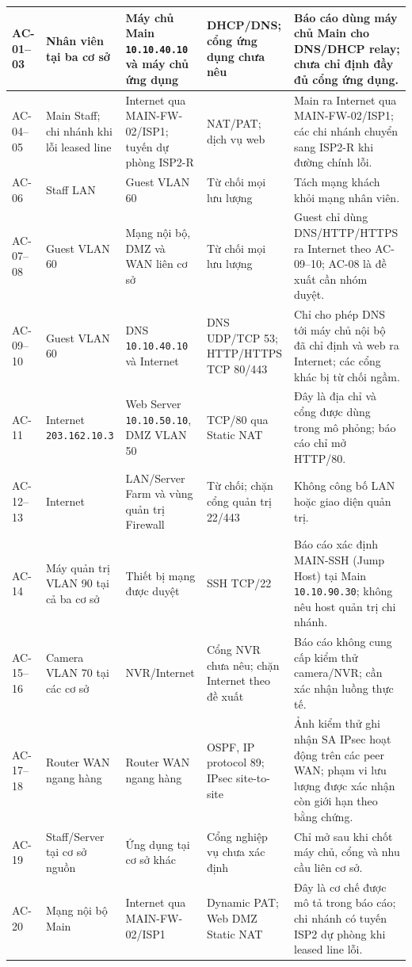 \begin{small}
\begin{longtable}{|p{1.3cm}|p{2.9cm}|p{3.0cm}|p{2.2cm}|p{4.2cm}|}
AC-01--03 & Nhân viên tại ba cơ sở & Máy chủ Main \texttt{10.10.40.10} và máy chủ ứng dụng & DHCP/DNS; cổng ứng dụng chưa nêu & Báo cáo dùng máy chủ Main cho DNS/DHCP relay; chưa chỉ định đầy đủ cổng ứng dụng. \\ \hline
AC-04--05 & Main Staff; chi nhánh khi lỗi leased line & Internet qua MAIN-FW-02/ISP1; tuyến dự phòng ISP2-R & NAT/PAT; dịch vụ web & Main ra Internet qua MAIN-FW-02/ISP1; các chi nhánh chuyển sang ISP2-R khi đường chính lỗi. \\ \hline
AC-06 & Staff LAN & Guest VLAN 60 & Từ chối mọi lưu lượng & Tách mạng khách khỏi mạng nhân viên. \\ \hline
AC-07--08 & Guest VLAN 60 & Mạng nội bộ, DMZ và WAN liên cơ sở & Từ chối mọi lưu lượng & Guest chỉ dùng DNS/HTTP/HTTPS ra Internet theo AC-09--10; AC-08 là đề xuất cần nhóm duyệt. \\ \hline
AC-09--10 & Guest VLAN 60 & DNS \texttt{10.10.40.10} và Internet & DNS UDP/TCP 53; HTTP/HTTPS TCP 80/443 & Chỉ cho phép DNS tới máy chủ nội bộ đã chỉ định và web ra Internet; các cổng khác bị từ chối ngầm. \\ \hline
AC-11 & Internet \texttt{203.162.10.3} & Web Server \texttt{10.10.50.10}, DMZ VLAN 50 & TCP/80 qua Static NAT & Đây là địa chỉ và cổng được dùng trong mô phỏng; báo cáo chỉ mở HTTP/80. \\ \hline
AC-12--13 & Internet & LAN/Server Farm và vùng quản trị Firewall & Từ chối; chặn cổng quản trị 22/443 & Không công bố LAN hoặc giao diện quản trị. \\ \hline
AC-14 & Máy quản trị VLAN 90 tại cả ba cơ sở & Thiết bị mạng được duyệt & SSH TCP/22 & Báo cáo xác định MAIN-SSH (Jump Host) tại Main \texttt{10.10.90.30}; không nêu host quản trị chi nhánh. \\ \hline
AC-15--16 & Camera VLAN 70 tại các cơ sở & NVR/Internet & Cổng NVR chưa nêu; chặn Internet theo đề xuất & Báo cáo không cung cấp kiểm thử camera/NVR; cần xác nhận luồng thực tế. \\ \hline
AC-17--18 & Router WAN ngang hàng & Router WAN ngang hàng & OSPF, IP protocol 89; IPsec site-to-site & Ảnh kiểm thử ghi nhận SA IPsec hoạt động trên các peer WAN; phạm vi lưu lượng được xác nhận còn giới hạn theo bằng chứng. \\ \hline
AC-19 & Staff/Server tại cơ sở nguồn & Ứng dụng tại cơ sở khác & Cổng nghiệp vụ chưa xác định & Chỉ mở sau khi chốt máy chủ, cổng và nhu cầu liên cơ sở. \\ \hline
AC-20 & Mạng nội bộ Main & Internet qua MAIN-FW-02/ISP1 & Dynamic PAT; Web DMZ Static NAT & Đây là cơ chế được mô tả trong báo cáo; chi nhánh có tuyến ISP2 dự phòng khi leased line lỗi. \\ \hline

\end{longtable}
\end{small}
